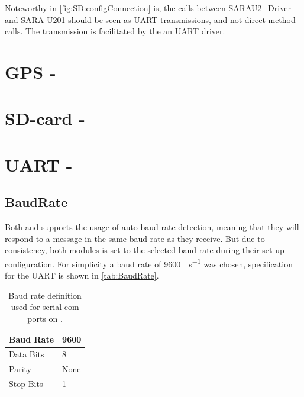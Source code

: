 Noteworthy in \cref{fig:SD:configConnection} is, the calls between SARAU2\_Driver and SARA U201 should be seen as UART transmissions, and not direct method calls. The transmission is facilitated by the an UART driver. 

\section{GPS - \GPS}





\section{SD-card - \SDsock}


\section{UART - \SAMD}



\subsection{BaudRate}
Both \SARA and \GPS supports the usage of auto baud rate detection, meaning that they will respond to a message in the same baud rate as they receive.
But due to consistency, both modules is set to the selected baud rate during their set up configuration. 
For simplicity a baud rate of \SI[per-mode = symbol]{9600}{\bit\per\second} was chosen, specification for the UART is shown in \vref{tab:BaudRate}.

\begin{table}[H]
	\begin{tabular}{ll}
		\hline 
		Baud Rate & 9600 \\ 
		\hline 
		Data Bits & 8 \\ 
		\hline 
		Parity & None \\ 
		\hline 
		Stop Bits & 1 \\ 
		\hline 
	\end{tabular}
	\centering
	\caption{Baud rate definition used for serial com ports on \SAMD.}
	\label{tab:BaudRate}
\end{table} 

\FloatBarrier